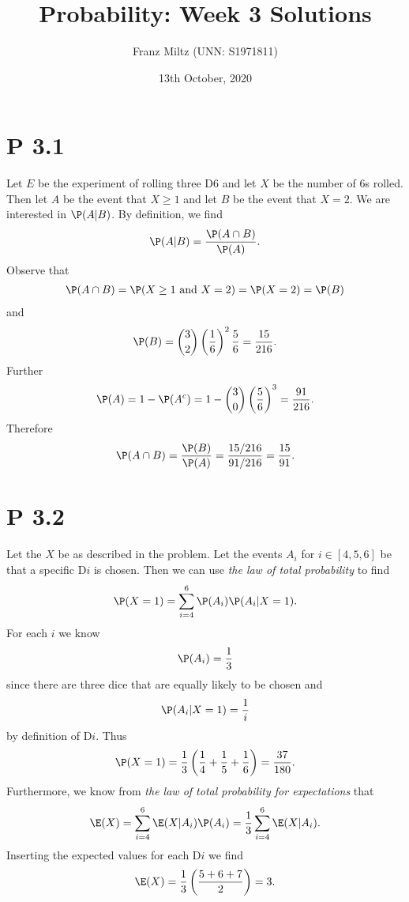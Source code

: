 \documentclass{article}
\begin{document}
\title{Probability: Week 3 Solutions}
\author{Franz Miltz (UNN: S1971811)}
\date{13th October, 2020}
\maketitle


\section*{P 3.1}


Let $E$ be the experiment of rolling three D6 and let $X$ be the number of 6s rolled.
Then let $A$ be the event that $X\geq 1$ and let $B$ be the event that $X=2$.
We are interested in $\P(A|B)$. By definition, we find
\begin{align*}
  \P(A|B) = \frac{\P(A\cap B)}{\P(A)}.
\end{align*}
Observe that
\begin{align*}
  \P(A\cap B) = \P(X\geq 1 \text{ and } X = 2) = \P(X=2) = \P(B)
\end{align*}
and
\begin{align*}
  \P(B) = \binom{3}{2}\left(\frac{1}{6}\right)^2\frac{5}{6}=\frac{15}{216}.
\end{align*}
Further
\begin{align*}
  \P(A) = 1-\P(A^c) = 1-\binom{3}{0}\left(\frac{5}{6}\right)^3=\frac{91}{216}.
\end{align*}
Therefore
\begin{align*}
  \P(A\cap B) = \frac{\P(B)}{\P(A)}= \frac{15/216}{91/216} = \frac{15}{91}.
\end{align*}


\section*{P 3.2}


Let the $X$ be as described in the problem. Let the events
$A_i$ for $i\in[4,5,6]$ be that a specific D$i$ is chosen.
Then we can use \emph{the law of total probability} to find
\begin{align*}
  \P(X=1)=\sum_{i=4}^6\P(A_i)\P(A_i|X=1).
\end{align*}
For each $i$ we know
\begin{align*}
  \P(A_i) = \frac{1}{3}
\end{align*}
since there are three dice that are equally likely to be chosen and
\begin{align*}
  \P(A_i|X=1) = \frac{1}{i}
\end{align*}
by definition of D$i$.
Thus
\begin{align*}
  \P(X=1) = \frac{1}{3}\left(\frac{1}{4}+\frac{1}{5}+\frac{1}{6}\right)=\frac{37}{180}.
\end{align*}
Furthermore, we know from \emph{the law of total probability for expectations} that
\begin{align*}
  \E(X) = \sum_{i=4}^6 \E(X|A_i)\P(A_i) = \frac{1}{3}\sum_{i=4}^6\E(X|A_i).
\end{align*}
Inserting the expected values for each D$i$ we find
\begin{align*}
  \E(X) = \frac{1}{3}\left(\frac{5 + 6 + 7}{2}\right)=3.
\end{align*}
\end{document}
